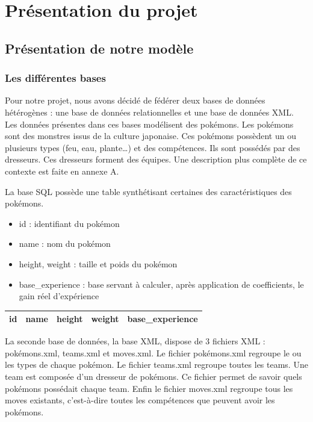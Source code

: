 \section{Présentation du projet}

\subsection{Présentation de notre modèle}

\subsubsection{Les différentes bases}

Pour notre projet, nous avons décidé de fédérer deux bases de données hétérogènes : une base de données relationnelles et une base de données XML. Les données présentes dans ces bases modélisent des pokémons. Les pokémons sont des monstres issus de la culture japonaise. Ces pokémons possèdent un ou plusieurs types (feu, eau, plante…) et des compétences. Ils sont possédés par des dresseurs. Ces dresseurs forment des équipes. Une description plus complète de ce contexte est faite en annexe A.

La base SQL possède une table synthétisant certaines des caractéristiques des pokémons.
\begin{itemize}
\item id : identifiant du pokémon	
\item name : nom du pokémon	
\item height, weight : taille et poids du pokémon	
\item base\_experience : base servant à calculer, après application de coefficients, le gain réel d'expérience
\end{itemize}

\begin{tabular}{|c|c|c|c|c|}
 \hline
 id & name & height & weight & base\_experience \\
 \hline
\end{tabular}

La seconde base de données, la base XML, dispose de 3 fichiers XML : pokémons.xml, teams.xml et moves.xml. Le fichier pokémons.xml regroupe le ou les types de chaque pokémon. Le fichier teams.xml regroupe toutes les teams. Une team est composée d'un dresseur de pokémons. Ce fichier permet de savoir quels pokémons possédait chaque team. Enfin le fichier moves.xml regroupe tous les moves existants, c'est-à-dire toutes les compétences que peuvent avoir les pokémons.


